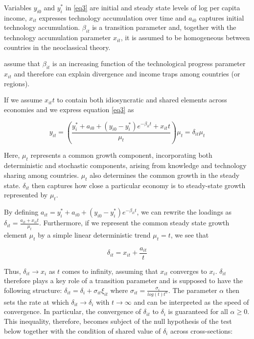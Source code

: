 \documentclass[11pt]{article}
\begin{document}
Variables $y_{i0}$ and $y_{i}^{*}$ in \eqref{eq3} are initial and steady state levels of log per capita income, $x_{it}$ expresses technology accumulation over time and $a_{i0}$ captures initial technology accumulation. $\beta_{it}$ is a transition parameter and, together with the technology accumulation parameter $x_{it}$, it is assumed to be homogeneous between countries in the neoclassical theory.

\citeauthor{phillips2007transition} assume that $\beta_{it}$ is an increasing function of the technological progress parameter $x_{it}$ and therefore can explain divergence and income traps among countries (or regions).

If we assume $x_{it}t$ to contain both idiosyncratic and shared elements across economies and we express equation \eqref{eq3} as

\begin{equation} 
\label{eq4} y_{it} = \left(\frac{ y_i^* + a_{i0} + (y_{i0} - y_i^*)e^{-\beta_{it}t} + x_{it}t}{\mu_t}\right)\mu_t = \delta_{it}\mu_t
\end{equation}

Here, \(\mu_t\) represents a common growth component, incorporating both deterministic and stochastic components, arising from knowledge and technology sharing among countries. \(\mu_t\) also determines the common growth in the steady state. \(\delta_{it}\) then captures how close a particular economy is to steady-state growth represented by \(\mu_t\).

By defining \(a_{it} = y_i^* + a_{i0} + (y_{i0} - y_i^*)e^{-\beta_{it}t}\), we can rewrite the loadings as \(\delta_{it} = \frac{a_{it} + x_{it}t}{\mu_t}\). Furthermore, if we represent the common steady state growth element \(\mu_t\) by a simple linear deterministic trend \(\mu_t = t\), we see that

\begin{equation} 
\label{eq5}\delta_{it} = x_{it} + \frac{a_{it}}{t}
\end{equation}  

Thus, \(\delta_{it} \rightarrow x_i\) as $t$ comes to infinity, assuming that $x_{it}$ converges to $x_{i}$. $\delta_{it}$ therefore plays a key role of a transition parameter and is supposed to have the following structure: \(\delta_{it} = \delta_{i} + \sigma_{it}\xi_{it}\) where \( \sigma_{it} = \frac{\sigma_{i}}{log(t)t^\alpha}\). The parameter $\alpha$ then sets the rate at which \(\delta_{it} \rightarrow \delta_{i}\) with \(t \rightarrow \infty\) and can be interpreted as the speed of convergence. In particular, the convergence of $\delta_{it}$ to $\delta_{i}$ is guaranteed for all \(\alpha \geq 0\). This inequality, therefore, becomes subject of the null hypothesis of the test below together with the condition of shared value of $\delta_{i}$ across cross-sections: 
\end{document}
